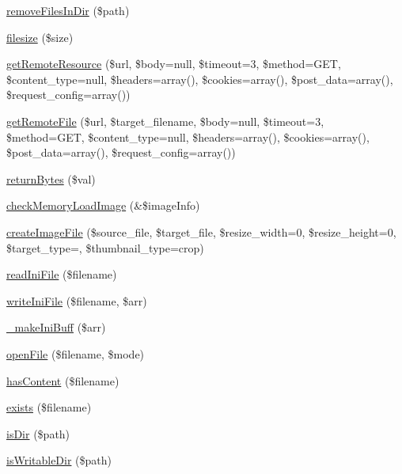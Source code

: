 \begin{DoxyCompactItemize}
\item 
\hyperlink{classFileHandler_a07839b4971e9ef40039d23ea65977d69}{remove\+Files\+In\+Dir} (\$path)
\item 
\hyperlink{classFileHandler_ae235b4ded589fb13caed260fabc0a30c}{filesize} (\$size)
\item 
\hyperlink{classFileHandler_a5f8d5b87d6636ac4b03f0e3804ab7a67}{get\+Remote\+Resource} (\$url, \$body=null, \$timeout=3, \$method=\textquotesingle{}G\+ET\textquotesingle{}, \$content\+\_\+type=null, \$headers=array(), \$cookies=array(), \$post\+\_\+data=array(), \$request\+\_\+config=array())
\item 
\hyperlink{classFileHandler_af9d34f1e90aea5141e8a1228db5d1922}{get\+Remote\+File} (\$url, \$target\+\_\+filename, \$body=null, \$timeout=3, \$method=\textquotesingle{}G\+ET\textquotesingle{}, \$content\+\_\+type=null, \$headers=array(), \$cookies=array(), \$post\+\_\+data=array(), \$request\+\_\+config=array())
\item 
\hyperlink{classFileHandler_a79dd068137470965b560f4d23d978e7d}{return\+Bytes} (\$val)
\item 
\hyperlink{classFileHandler_a0b240e89b6ce57cb94e855fc25e5e9f3}{check\+Memory\+Load\+Image} (\&\$image\+Info)
\item 
\hyperlink{classFileHandler_ab69dd4ee5c411880e9a6e343aa36b635}{create\+Image\+File} (\$source\+\_\+file, \$target\+\_\+file, \$resize\+\_\+width=0, \$resize\+\_\+height=0, \$target\+\_\+type=\textquotesingle{}\textquotesingle{}, \$thumbnail\+\_\+type=\textquotesingle{}crop\textquotesingle{})
\item 
\hyperlink{classFileHandler_a58a8bbae1ab4acb358599db38a47db4d}{read\+Ini\+File} (\$filename)
\item 
\hyperlink{classFileHandler_aa0fd9ce8f2c81bee472a403e75b578bd}{write\+Ini\+File} (\$filename, \$arr)
\item 
\hyperlink{classFileHandler_a8975f9247987757497e0288f3ee09173}{\+\_\+make\+Ini\+Buff} (\$arr)
\item 
\hyperlink{classFileHandler_a690753d8cf8ff837f28a811cdfbfa069}{open\+File} (\$filename, \$mode)
\item 
\hyperlink{classFileHandler_ad872016e83b1f62a03d54e359ce31f73}{has\+Content} (\$filename)
\item 
\hyperlink{classFileHandler_a862c4f6349792ae8f094ec456c9a26ed}{exists} (\$filename)
\item 
\hyperlink{classFileHandler_a5fd371542d6f1a86269d0b8795e74471}{is\+Dir} (\$path)
\item 
\hyperlink{classFileHandler_a9494e34a28f27b6a1ab2e032aada2bbb}{is\+Writable\+Dir} (\$path)
\end{DoxyCompactItemize}



